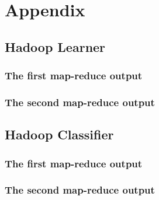 \documentclass{article}
\begin{document}
\section{Appendix}
\subsection{Hadoop Learner}
\subsubsection{The first map-reduce output}

\subsubsection{The second map-reduce output}

\subsection{Hadoop Classifier}
\subsubsection{The first map-reduce output}

\subsubsection{The second map-reduce output}

\end{document}
